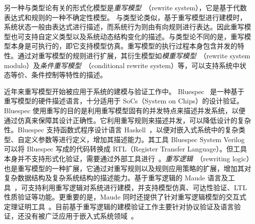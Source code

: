 另一种与类型论有关的形式化模型是\emph{重写模型}~\cite{DBLP:books/el/leeuwen90/DershowitzJ90,terese}（rewrite system），它是基于代数表达式和规则的一种不确定性模型。
与类型论类似，基于重写模型进行建模时，系统状态一般由表达式进行描述，而系统行为则由有向规则进行表达。因此重写模型也可支持自定义类型以及系统动态结构变化的描述。与类型论不同的是，重写模型本身是可执行的，即它支持模型仿真。重写模型的执行过程本身包含并发的特性。通过对重写模型的规则进行扩展，其衍生模型如\emph{模重写模型}~\cite{DBLP:journals/jacm/PetersonS81}（rewrite system modulo）及\emph{条件重写模型}~\cite{DBLP:conf/ctrs/Gramlich94}（conditional rewrite system）等，可以支持系统中状态等价、条件控制等特性的描述。  

近年来重写模型开始被应用于系统的建模与验证工作中。 Bluespec~\cite{nikhil2008bluespec} 是一种基于重写模型的硬件描述语言，十分适用于 SoCs（System on Chips）的设计验证。Bluespec 使用重写的目的是利用重写模型固有的并发特点来描述并发系统，以便通过仿真来保障其设计正确性。它利用重写规则来描述并发，可以降低设计的复杂性。Bluespec 支持函数式程序设计语言 Haskell~\cite{DBLP:books/daglib/0033100}，以便对嵌入式系统中的复杂类型、自定义参数等进行定义，增加其描述能力。其工具 Bluespec System Verilog~\cite{DBLP:conf/memocode/Nikhil04} 可以将 Bluespec 写成的代码转换成 RTL（Register Transfer Language）。但工具本身并不支持形式化验证，需要通过外部工具进行~\cite{DBLP:conf/mtv/SinghS07}。\emph{重写逻辑}~\cite{DBLP:journals/tcs/Marte-OlietM02,DBLP:journals/jlp/Meseguer12}（rewriting logic）也是重写模型的一种扩展，它通过对重写规则以及规则应用策略的扩展，增加其对复杂数据结构及复杂系统结构的描述能力。基于重写逻辑的 Maude 语言及工具~\cite{DBLP:journals/tcs/ClavelDELMMQ02,DBLP:journals/lisp/OlveczkyM07}，可支持利用重写逻辑对系统进行建模，并支持模型仿真、可达性验证、LTL 性质验证等功能。更重要的是，Maude 同时还提供了针对重写逻辑模型的交互式定理证明工具~\cite{DBLP:journals/jucs/ClavelPR06}。目前基于重写逻辑的建模验证工作主要针对协议验证及语言验证，还没有被广泛应用于嵌入式系统领域~\cite{DBLP:journals/jlp/Meseguer12,DBLP:journals/iandc/MeseguerR13}。

